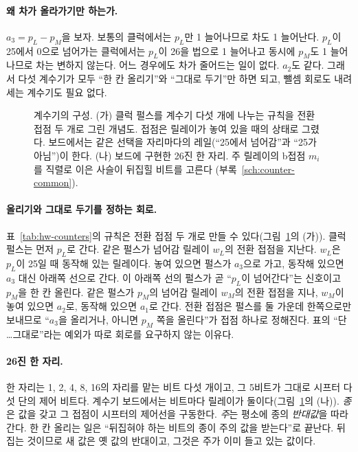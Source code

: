 \paragraph{왜 차가 올라가기만 하는가.} $a_3 = p_L - p_M$을 보자. 보통의 클럭에서는 $p_L$만 1 늘어나므로 차도
1 늘어난다. $p_L$이 25에서 0으로 넘어가는 클럭에서는 $p_L$이 26을 법으로 1 늘어나고 동시에 $p_M$도 1
늘어나므로 차는 변하지 않는다. 어느 경우에도 차가 줄어드는 일이 없다. $a_2$도 같다. 그래서 다섯 계수기가
모두 ``한 칸 올리기''와 ``그대로 두기''만 하면 되고, 뺄셈 회로도 내려 세는 계수기도 필요 없다.

\begin{figure}[ht]
\centering

\caption{계수기의 구성. (가) 클럭 펄스를 계수기 다섯 개에 나누는 규칙을 전환 접점 두 개로 그린 개념도. 접점은
릴레이가 놓여 있을 때의 상태로 그렸다. 보드에서는 같은 선택을 자리마다의 레일(``25에서 넘어감''과 ``25가 아님'')이
한다. (나) 보드에 구현한 26진 한 자리. 주 릴레이의 b접점 $m_i$를 직렬로 이은 사슬이 뒤집힐 비트를 고른다
(부록~\ref{sch:counter-common}).}
\label{fig:hw-counter}
\end{figure}

\paragraph{올리기와 그대로 두기를 정하는 회로.} 표~\ref{tab:hw-counters}의 규칙은 전환 접점 두 개로 만들 수
있다(그림~\ref{fig:hw-counter}의 (가)). 클럭 펄스는 먼저 $p_L$로 간다. 같은 펄스가 넘어감 릴레이 $w_L$의
전환 접점을 지난다. $w_L$은 $p_L$이 25일 때 동작해 있는 릴레이다. 놓여 있으면 펄스가 $a_3$으로 가고, 동작해
있으면 $a_3$ 대신 아래쪽 선으로 간다. 이 아래쪽 선의 펄스가 곧 ``$p_L$이 넘어간다''는 신호이고 $p_M$을 한 칸
올린다. 같은 펄스가 $p_M$의 넘어감 릴레이 $w_M$의 전환 접점을 지나, $w_M$이 놓여 있으면 $a_2$로, 동작해
있으면 $a_1$로 간다. 전환 접점은 펄스를 둘 가운데 한쪽으로만 보내므로 ``$a_3$을 올리거나, 아니면 $p_M$ 쪽을
올린다''가 접점 하나로 정해진다. 표의 ``단 \ldots 그대로''라는 예외가 따로 회로를 요구하지 않는 이유다.

\paragraph{26진 한 자리.} 한 자리는 1, 2, 4, 8, 16의 자리를 맡는 비트 다섯 개이고, 그 5비트가 그대로 시프터
다섯 단의 제어 비트다. 계수기 보드에서는 비트마다 릴레이가 둘이다(그림~\ref{fig:hw-counter}의 (나)). \emph{종}은
값을 갖고 그 접점이 시프터의 제어선을 구동한다. \emph{주}는 평소에 종의 \emph{반대값}을 따라간다. 한 칸 올리는 일은
``뒤집혀야 하는 비트의 종이 주의 값을 받는다''로 끝난다. 뒤집는 것이므로 새 값은 옛 값의 반대이고, 그것은 주가
이미 들고 있는 값이다.

